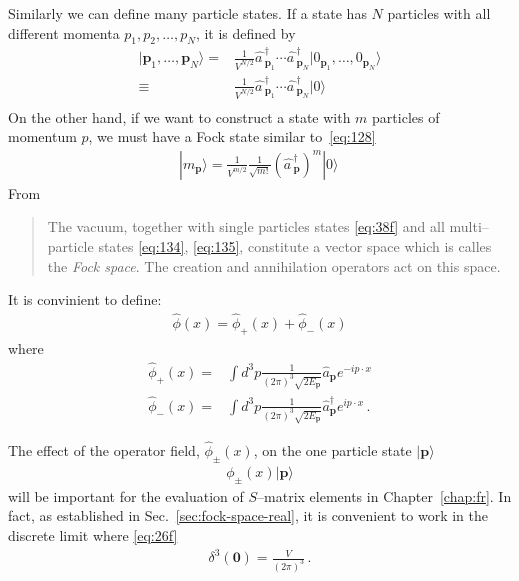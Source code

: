 \begin{frame}
Similarly we can define many particle states. If a state has $N$ particles with all different momenta $p_1,p_2,\ldots,p_N$, it is defined by
\begin{align}
  \label{eq:134}
  |\mathbf{p}_1,\ldots,\mathbf{p}_N\rangle=&\frac{1}{V^{N/2}}\widehat{a\,}_{\mathbf{p}_1}^\dagger\cdots
\widehat{a\,}_{\mathbf{p}_N}^\dagger|0_{\mathbf{p}_1},\ldots,0_{\mathbf{p}_N}\rangle\nonumber\\
\equiv&\frac{1}{V^{N/2}}\widehat{a\,}_{\mathbf{p}_1}^\dagger\cdots
\widehat{a\,}_{\mathbf{p}_N}^\dagger|0\rangle\nonumber\\
\end{align}
On the other hand, if we want to construct a state with $m$ particles of momentum $p$, we must have a Fock state similar to~\eqref{eq:128}
\begin{align}
\label{eq:135}
  |m_{\mathbf{p}}\rangle=\frac{1}{V^{m/2}}\frac{1}{\sqrt{m!}}\left(\widehat{a\,}_{\mathbf{p}}^\dagger\right)^{m}|0\rangle\,
\end{align}
From\cite{Lahiri:2005sm}
\begin{quote}
  The vacuum, together with single particles states \eqref{eq:38f} and all multi--particle states \eqref{eq:134}, \eqref{eq:135}, constitute a vector space which is calles the \emph{Fock space}. The creation and annihilation operators act on this space.
\end{quote}



It is convinient to define: 
\begin{align}
\label{eq:36}
  \widehat{\phi}(x)=\widehat{\phi}_+(x)+\widehat{\phi}_-(x)
\end{align}
where
\begin{align}
\label{eq:37f}
  \widehat{\phi}_+(x)=&\int d^3p \frac{1}{(2\pi)^3\sqrt{2E_\mathbf{p} }}
  \widehat{a}_\mathbf{p} e^{-i p\cdot x }\nonumber\\
  \widehat{\phi}_-(x)=&\int d^3p \frac{1}{(2\pi)^3\sqrt{2E_\mathbf{p} }}\widehat{a}_\mathbf{p}^\dagger e^{i p\cdot x }\,.
\end{align}

The effect of the operator field, $\widehat{\phi}_\pm(x)$, on the one particle state $|\mathbf{p}\rangle$
\begin{align}
  \phi_\pm(x)|\mathbf{p}\rangle
\end{align}
will be important for the evaluation of $S$--matrix elements in Chapter~\ref{chap:fr}. In fact,
as established in Sec.~\ref{sec:fock-space-real}, it is convenient to work in the discrete limit where \eqref{eq:26f}
\begin{align}
   \delta^3(\mathbf{0})=\frac{V}{(2\pi)^3}\,.
\end{align}


\end{frame}
